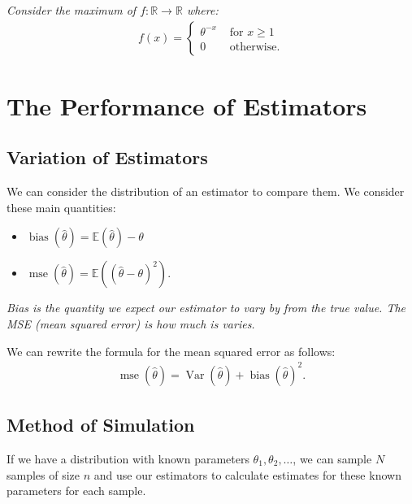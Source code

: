 \documentclass[a4paper, 12pt, twoside]{article}
\DeclareMathOperator{\Mse}{mse}
\DeclareMathOperator{\Bias}{bias}
\DeclareMathOperator{\Var}{Var}
\begin{document}
\textit{Consider the maximum of $f:\mathbb{R} \to \mathbb{R}$ where:}
\begin{align*}
    f(x) = \begin{cases}
        \theta^{-x} & \text{ for } x \geq 1 \\
        0           & \text{ otherwise.}
    \end{cases}
\end{align*}

\section{The Performance of Estimators}

\subsection{Variation of Estimators}

We can consider the distribution of an estimator to compare them. We
consider these main quantities:

\begin{itemize}
    \item $\Bias(\hat\theta) = \mathbb{E}(\hat\theta) - \theta$
    \item $\Mse(\hat\theta) = \mathbb{E}((\hat\theta - \theta)^2)$.
\end{itemize}

\textit{Bias is the quantity we expect our estimator to vary by from
    the true value. The MSE (mean squared error) is how much is varies.}

\vspace{\baselineskip}

We can rewrite the formula for the mean squared error as follows:
\begin{align*}
    \Mse(\hat\theta) = \Var(\hat\theta) + \Bias(\hat\theta)^2.
\end{align*}

\subsection{Method of Simulation}

If we have a distribution with known parameters $\theta_1, \theta_2,
    \ldots$, we can sample $N$ samples of size $n$ and use our estimators
to calculate estimates for these known parameters for each sample.

\vspace{\baselineskip}
\end{document}
